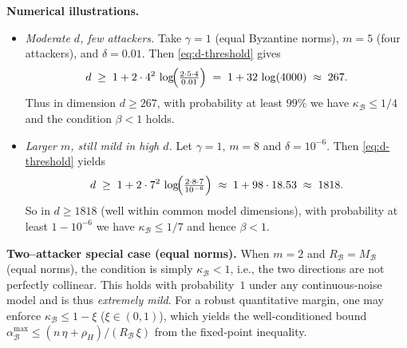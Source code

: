 \documentclass{article}
\theoremstyle{plain}
\theoremstyle{definition}
\theoremstyle{remark}
\newcommand{\cB}{\mathcal{B}}
\begin{document}
\medskip
\noindent\textbf{Numerical illustrations.}
\begin{itemize}
\item \emph{Moderate $d$, few attackers.}  
Take $\gamma=1$ (equal Byzantine norms), $m=5$ (four attackers), and $\delta=0.01$.  
Then \eqref{eq:d-threshold} gives
\[
d \;\ge\; 1 + 2\cdot 4^{2}\,\log\!\Bigl(\tfrac{2\cdot 5\cdot 4}{0.01}\Bigr)
\;=\; 1 + 32\,\log(4000)
\;\approx\; 267.
\]
Thus in dimension $d\!\ge\!267$, with probability at least $99\%$ we have
\(\kappa_{\cB} \le 1/4\) and the condition \(\beta<1\) holds.
\item \emph{Larger $m$, still mild in high $d$.}  
Let $\gamma=1$, $m=8$ and $\delta=10^{-6}$.  
Then \eqref{eq:d-threshold} yields
\[
d \;\ge\; 1 + 2\cdot 7^{2}\,\log\!\Bigl(\tfrac{2\cdot 8\cdot 7}{10^{-6}}\Bigr)
\;\approx\; 1 + 98\cdot 18.53
\;\approx\; 1818.
\]
So in $d\!\ge\!1818$ (well within common model dimensions), with probability at least $1-10^{-6}$
we have \(\kappa_{\cB} \le 1/7\) and hence \(\beta<1\).
\end{itemize}

\medskip
\noindent\textbf{Two–attacker special case (equal norms).}
When $m=2$ and $R_{\cB}=M_{\cB}$ (equal norms), the condition is simply \(\kappa_{\cB}<1\),
i.e., the two directions are not perfectly collinear. This holds with probability~$1$ under any
continuous‑noise model and is thus \emph{extremely mild}. For a robust quantitative margin, one may
enforce $\kappa_{\cB}\le 1-\xi$ ($\xi\in(0,1)$), which yields the well‑conditioned bound
\(
\alpha_{\cB}^{\max}\le (n\,\eta+\rho_H)/(R_{\cB}\,\xi)
\)
from the fixed‑point inequality.
\end{document}
